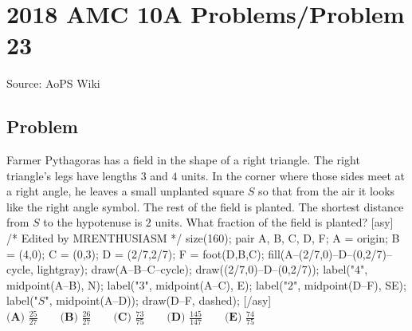 \documentclass[12pt]{article}
\begin{document}
\section*{{2018 AMC 10A Problems/Problem 23}}
Source: AoPS Wiki

\subsection*{Problem}
Farmer Pythagoras has a field in the shape of a right triangle. The right triangle's legs have lengths $3$ and $4$ units. In the corner where those sides meet at a right angle, he leaves a small unplanted square $S$ so that from the air it looks like the right angle symbol. The rest of the field is planted. The shortest distance from $S$ to the hypotenuse is $2$ units. What fraction of the field is planted? [asy] /* Edited by MRENTHUSIASM */ size(160); pair A, B, C, D, F; A = origin; B = (4,0); C = (0,3); D = (2/7,2/7); F = foot(D,B,C); fill(A--(2/7,0)--D--(0,2/7)--cycle, lightgray); draw(A--B--C--cycle); draw((2/7,0)--D--(0,2/7)); label("$4$", midpoint(A--B), N); label("$3$", midpoint(A--C), E); label("$2$", midpoint(D--F), SE); label("$S$", midpoint(A--D)); draw(D--F, dashed); [/asy] $\textbf{(A) } \frac{25}{27} \qquad \textbf{(B) } \frac{26}{27} \qquad \textbf{(C) } \frac{73}{75} \qquad \textbf{(D) } \frac{145}{147} \qquad \textbf{(E) } \frac{74}{75}$
\end{document}
